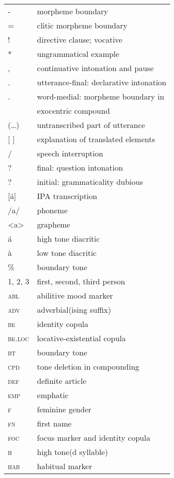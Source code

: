 \label{sec:abbr}
\begin{tabularx}{.45\textwidth}{lQ}
 {}- & morpheme boundary \\
 = & clitic morpheme boundary \\
 ! & directive clause; vocative \\
 * & ungrammatical example \\
 , & continuative intonation and pause \\
 . & utterance-final: declarative intonation \\
 . & word-medial: morpheme boundary in \\
& exocentric compound \\
 (…) & untranscribed part of utterance \\{}
 [  ] & explanation of translated elements \\
 / & speech interruption \\
 ? & final: question intonation \\
 ? & initial: grammaticality dubious \\{}
 [á] & IPA transcription \\
 /a/ & phoneme \\
 <a> & grapheme \\
 á & high tone diacritic \\
 à & low tone diacritic \\
 \% & boundary tone \\
 1, 2, 3 & first, second, third person \\
 \textsc{abl} & abilitive mood marker \\
 \textsc{adv} & adverbial(ising suffix) \\
 \textsc{be} & identity copula \\
 \textsc{be.loc} & locative-existential copula \\
 \textsc{bt} & boundary tone \\
 \textsc{cpd} & tone deletion in compounding \\
 \textsc{def} & definite article \\
 \textsc{emp} & emphatic \\
 \textsc{f} & feminine gender \\
 \textsc{fn} & first name \\
 \textsc{foc} & focus marker and identity copula \\
 \textsc{h} & high tone(d syllable) \\
 \textsc{hab} & habitual marker \\
\end{tabularx}
